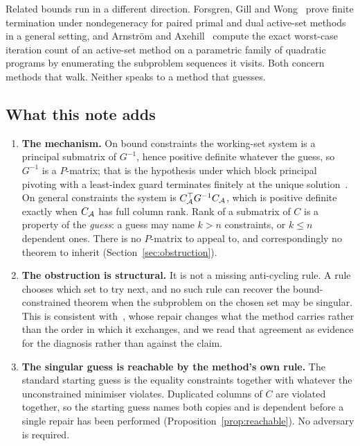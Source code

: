Related bounds run in a different direction. Forsgren, Gill and
Wong~\cite{forsgren2016} prove finite termination under nondegeneracy for paired
primal and dual active-set methods in a general setting, and Arnstr\"om and
Axehill~\cite{arnstrom2022certification} compute the exact worst-case iteration
count of an active-set method on a parametric family of quadratic programs by
enumerating the subproblem sequences it visits. Both concern methods that walk.
Neither speaks to a method that guesses.

\subsection{What this note adds}
\label{ssec:claims}

\begin{enumerate}
\item \textbf{The mechanism.} On bound constraints the working-set system is a
principal submatrix of $G^{-1}$, hence positive definite whatever the guess, so
$G^{-1}$ is a $P$-matrix; that is the hypothesis under which block principal
pivoting with a least-index guard terminates finitely at the unique
solution~\cite{judice1994,murty1988}. On general constraints the system is
$C_{\mathcal{A}}^{\top} G^{-1} C_{\mathcal{A}}$, which is positive definite exactly when
$C_{\mathcal{A}}$ has full column rank. Rank of a submatrix of $C$ is a property of the
\emph{guess}: a guess may name $k > n$ constraints, or $k \le n$ dependent ones.
There is no $P$-matrix to appeal to, and correspondingly no theorem to inherit
(Section~\ref{sec:obstruction}).

\item \textbf{The obstruction is structural.} It is not a missing anti-cycling
rule. A rule chooses which set to try next, and no such rule can recover the
bound-constrained theorem when the subproblem on the chosen set may be singular.
This is consistent with~\cite{curtis2015pdas}, whose repair changes what the
method carries rather than the order in which it exchanges, and we read that
agreement as evidence for the diagnosis rather than against the claim.

\item \textbf{The singular guess is reachable by the method's own rule.} The
standard starting guess is the equality constraints together with whatever the
unconstrained minimiser violates. Duplicated columns of $C$ are violated together,
so the starting guess names both copies and is dependent before a single repair
has been performed (Proposition~\ref{prop:reachable}). No adversary is required.


\end{enumerate}
